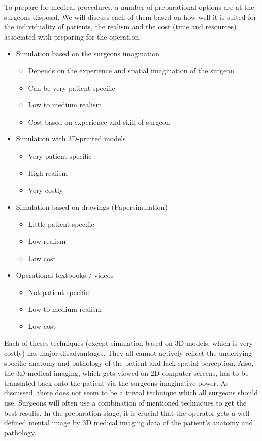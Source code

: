 To prepare for medical procedures, a number of preparational options are at the surgeons disposal.
We will discuss each of them based on how well it is suited for the individuality of patients, the realism and the cost (time and resources) associated with preparing for the operation.

\begin{itemize}
    \item Simulation based on the surgeons imagination
    \begin{itemize}
        \item Depends on the experience and spatial imagination of the surgeon
        \item Can be very patient specific
        \item Low to medium realism
        \item Cost based on experience and skill of surgeon
    \end{itemize}
    \item Simulation with 3D-printed models
    \begin{itemize}
        \item Very patient specific
        \item High realism
        \item Very costly
    \end{itemize}
    \item Simulation based on drawings (Papersimulation)
    \begin{itemize}
        \item Little patient specific
        \item Low realism
        \item Low cost
    \end{itemize}
    \item Operational textbooks / videos
    \begin{itemize}
        \item Not patient specific
        \item Low to medium realism
        \item Low cost
    \end{itemize}
\end{itemize}

Each of theses techniques (except simulation based on 3D models, which is very costly) has major disadvantages.
They all cannot actively reflect the underlying specific anatomy and pathology of the patient and lack spatial perception.
Also, the 3D medical imaging, which gets viewed on 2D computer screens, has to be translated back onto the patient via the surgeons imaginative power. 
As discussed, there does not seem to be a trivial technique which all surgeons should use.
Surgeons will often use a combination of mentioned techniques to get the best results.
In the preparation stage, it is crucial that the operator gets a well defined mental image by 3D medical imaging data of the patient's anatomy and pathology.

